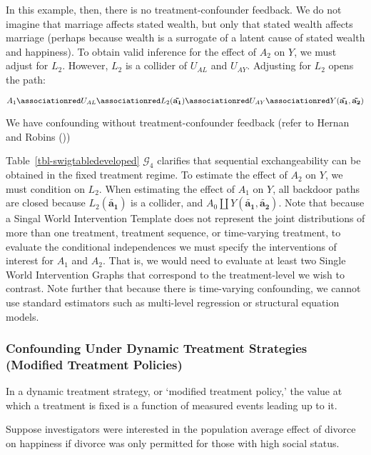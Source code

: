 \documentclass[
  single column]{article}
\begin{document}
In this example, then, there is no treatment-confounder feedback. We do
not imagine that marriage affects stated wealth, but only that stated
wealth affects marriage (perhaps because wealth is a surrogate of a
latent cause of stated wealth and happiness). To obtain valid inference
for the effect of \(A_2\) on \(Y\), we must adjust for \(L_2\). However,
\(L_2\) is a collider of \(U_{AL}\) and \(U_{AY}\). Adjusting for
\(L_2\) opens the path:

\[
A_1 \associationred U_{AL} \associationred L_2({\mathbf{\tilde{a_1}}})  \associationred U_{AY} \associationred Y({\mathbf{\tilde{a_1}, \tilde{a_2}}})
\]

We have confounding without treatment-confounder feedback (refer to
Hernan and Robins ())

Table~\ref{tbl-swigtabledeveloped} \(\mathcal{G}_4\) clarifies that
sequential exchangeability can be obtained in the fixed treatment
regime. To estimate the effect of \(A_2\) on \(Y\), we must condition on
\(L_2\). When estimating the effect of \(A_1\) on \(Y\), all backdoor
paths are closed because \(L_2({\mathbf{\tilde{a_1}}})\) is a collider,
and \(A_0 \coprod Y({\mathbf{\tilde{a_1}, \tilde{a_2}}})\). Note that
because a Singal World Intervention Template does not represent the
joint distributions of more than one treatment, treatment sequence, or
time-varying treatment, to evaluate the conditional independences we
must specify the interventions of interest for \(A_1\) and \(A_2\). That
is, we would need to evaluate at least two Single World Intervention
Graphs that correspond to the treatment-level we wish to contrast. Note
further that because there is time-varying confounding, we cannot use
standard estimators such as multi-level regression or structural
equation models.

\subsubsection{Confounding Under Dynamic Treatment Strategies (Modified
Treatment
Policies)}\label{confounding-under-dynamic-treatment-strategies-modified-treatment-policies}

In a dynamic treatment strategy, or `modified treatment policy,' the
value at which a treatment is fixed is a function of measured events
leading up to it.

Suppose investigators were interested in the population average effect
of divorce on happiness if divorce was only permitted for those with
high social status.
\end{document}
